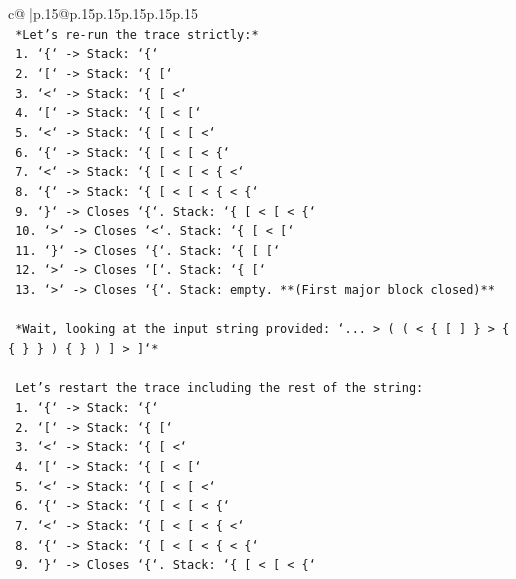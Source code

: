\documentclass{article}
\begin{document}
{\begin{supertabular}{c@{$\;$}|p{.15\linewidth}@{}p{.15\linewidth}p{.15\linewidth}p{.15\linewidth}p{.15\linewidth}p{.15\linewidth}}
{{{\\ 
\texttt{    *Let's re{-}run the trace strictly:*} \\
\texttt{    1.  `\{` {-}> Stack: `\{`} \\
\texttt{    2.  `{[}` {-}> Stack: `\{ {[}`} \\
\texttt{    3.  `<` {-}> Stack: `\{ {[} <`} \\
\texttt{    4.  `{[}` {-}> Stack: `\{ {[} < {[}`} \\
\texttt{    5.  `<` {-}> Stack: `\{ {[} < {[} <`} \\
\texttt{    6.  `\{` {-}> Stack: `\{ {[} < {[} < \{`} \\
\texttt{    7.  `<` {-}> Stack: `\{ {[} < {[} < \{ <`} \\
\texttt{    8.  `\{` {-}> Stack: `\{ {[} < {[} < \{ < \{`} \\
\texttt{    9.  `\}` {-}> Closes `\{`. Stack: `\{ {[} < {[} < \{`} \\
\texttt{    10. `>` {-}> Closes `<`. Stack: `\{ {[} < {[}`} \\
\texttt{    11. `\}` {-}> Closes `\{`. Stack: `\{ {[} {[}`} \\
\texttt{    12. `>` {-}> Closes `{[}`. Stack: `\{ {[}`} \\
\texttt{    13. `>` {-}> Closes `\{`. Stack: empty. **(First major block closed)**} \\
\\ 
\texttt{    *Wait, looking at the input string provided: `... > ( ( < \{ {[} {]} \} > \{ \{ \} \} ) \{ \} ) {]} > {]}`*} \\
\\ 
\texttt{    Let's restart the trace including the rest of the string:} \\
\texttt{    1.  `\{` {-}> Stack: `\{`} \\
\texttt{    2.  `{[}` {-}> Stack: `\{ {[}`} \\
\texttt{    3.  `<` {-}> Stack: `\{ {[} <`} \\
\texttt{    4.  `{[}` {-}> Stack: `\{ {[} < {[}`} \\
\texttt{    5.  `<` {-}> Stack: `\{ {[} < {[} <`} \\
\texttt{    6.  `\{` {-}> Stack: `\{ {[} < {[} < \{`} \\
\texttt{    7.  `<` {-}> Stack: `\{ {[} < {[} < \{ <`} \\
\texttt{    8.  `\{` {-}> Stack: `\{ {[} < {[} < \{ < \{`} \\
\texttt{    9.  `\}` {-}> Closes `\{`. Stack: `\{ {[} < {[} < \{`} \\
}}}
\end{supertabular}}
\end{document}
